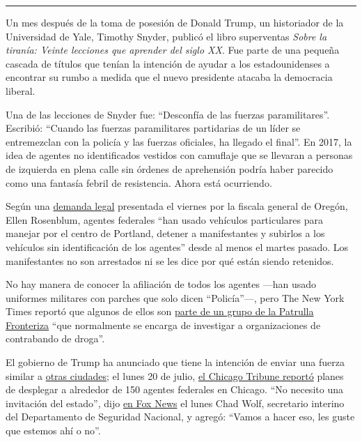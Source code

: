 \begin{center}\rule{0.5\linewidth}{\linethickness}\end{center}

Un mes después de la toma de posesión de Donald Trump, un historiador de
la Universidad de Yale, Timothy Snyder, publicó el libro superventas
\emph{Sobre la tiranía: Veinte lecciones que aprender del siglo XX}. Fue
parte de una pequeña cascada de títulos que tenían la intención de
ayudar a los estadounidenses a encontrar su rumbo a medida que el nuevo
presidente atacaba la democracia liberal.

Una de las lecciones de Snyder fue: ``Desconfía de las fuerzas
paramilitares''. Escribió: ``Cuando las fuerzas paramilitares
partidarias de un líder se entremezclan con la policía y las fuerzas
oficiales, ha llegado el final''. En 2017, la idea de agentes no
identificados vestidos con camuflaje que se llevaran a personas de
izquierda en plena calle sin órdenes de aprehensión podría haber
parecido como una fantasía febril de resistencia. Ahora está ocurriendo.

Según una
\href{http://opb-imgserve-production.s3-website-us-west-2.amazonaws.com/original/ag_rosenblum_xxxx_updated_complaint_1595086491349.pdf}{demanda
legal} presentada el viernes por la fiscala general de Oregón, Ellen
Rosenblum, agentes federales ``han usado vehículos particulares para
manejar por el centro de Portland, detener a manifestantes y subirlos a
los vehículos sin identificación de los agentes'' desde al menos el
martes pasado. Los manifestantes no son arrestados ni se les dice por
qué están siendo retenidos.

No hay manera de conocer la afiliación de todos los agentes ---han usado
uniformes militares con parches que solo dicen ``Policía''---, pero The
New York Times reportó que algunos de ellos son
\href{https://www.nytimes3xbfgragh.onion/2020/07/18/us/portland-protests.html}{parte
de un grupo de la Patrulla Fronteriza} ``que normalmente se encarga de
investigar a organizaciones de contrabando de droga''.

El gobierno de Trump ha anunciado que tiene la intención de enviar una
fuerza similar a
\href{https://www.motherjones.com/anti-racism-police-protest/2020/07/trump-border-patrol-cities-portland-chicago/}{otras
ciudades}; el lunes 20 de julio,
\href{https://www.chicagotribune.com/news/criminal-justice/ct-chicago-police-dhs-deployment-20200720-dftu5ychwbcxtg4ltarh5qnwma-story.html}{el
Chicago Tribune reportó} planes de desplegar a alrededor de 150 agentes
federales en Chicago. ``No necesito una invitación del estado'', dijo
\href{https://twitter.com/atrupar/status/1285224329878306817?s=20}{en
Fox News} el lunes Chad Wolf, secretario interino del Departamento de
Seguridad Nacional, y agregó: ``Vamos a hacer eso, les guste que estemos
ahí o no''.

